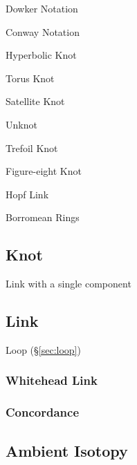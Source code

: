 Dowker Notation

Conway Notation



Hyperbolic Knot

Torus Knot

Satellite Knot



Unknot

Trefoil Knot

Figure-eight Knot

Hopf Link

Borromean Rings



\subsection{Knot} \label{sec:knot}

Link with a single component %



\subsection{Link} \label{sec:link}

Loop (\S\ref{sec:loop})



\subsubsection{Whitehead Link} \label{sec:whitehead_link}

\subsubsection{Concordance} \label{sec:concordance}



\subsection{Ambient Isotopy} \label{sec:ambient_isotopy}

